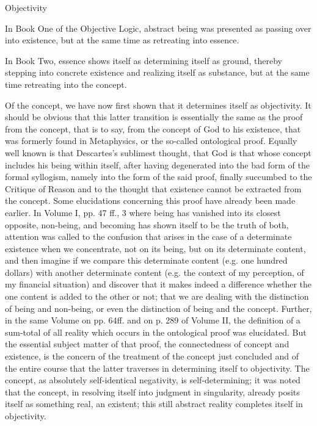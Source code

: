 Objectivity

In Book One of the Objective Logic,
abstract being was presented as
passing over into existence,
but at the same time as
retreating into essence.

In Book Two, essence shows itself as
determining itself as ground,
thereby stepping into concrete existence
and realizing itself as substance,
but at the same time
retreating into the concept.

Of the concept, we have now first shown
that it determines itself as objectivity.
It should be obvious that this latter transition is
essentially the same as the proof from the concept,
that is to say, from the concept of God to his existence,
that was formerly found in
Metaphysics, or the so-called ontological proof.
Equally well known is that
Descartes's sublimest thought,
that God is that whose concept includes his
being within itself,
after having degenerated into the bad form of the formal
syllogism, namely into the form of the said proof, finally succumbed to
the Critique of Reason and to the thought that existence cannot be extracted
from the concept.
Some elucidations concerning this proof have already
been made earlier. In Volume I, pp. 47 ff., 3 where being has vanished into
its closest opposite, non-being,
and becoming has shown itself to be the
truth of both,
attention was called to the confusion that arises in the case
of a determinate existence when we concentrate, not on its being,
but on its determinate content,
and then imagine if we compare this determinate content
(e.g. one hundred dollars) with another determinate content
(e.g. the context of my perception, of my financial situation)
and discover that it makes indeed a difference whether
the one content is added to the other or not;
that we are dealing with the distinction of being and non-being,
or even the distinction of being and the concept.
Further, in the same Volume
on pp. 64ff. and on p. 289 of Volume II,
the definition of a sum-total of all reality
which occurs in the ontological proof was elucidated.
But the essential subject matter of that proof,
the connectedness of concept and existence,
is the concern of the treatment of the concept just concluded
and of the entire course that the latter traverses
in determining itself to objectivity.
The concept, as absolutely self-identical negativity,
is self-determining;
it was noted that the concept,
in resolving itself into judgment in singularity,
already posits itself as something real, an existent;
this still abstract reality completes itself in objectivity.

